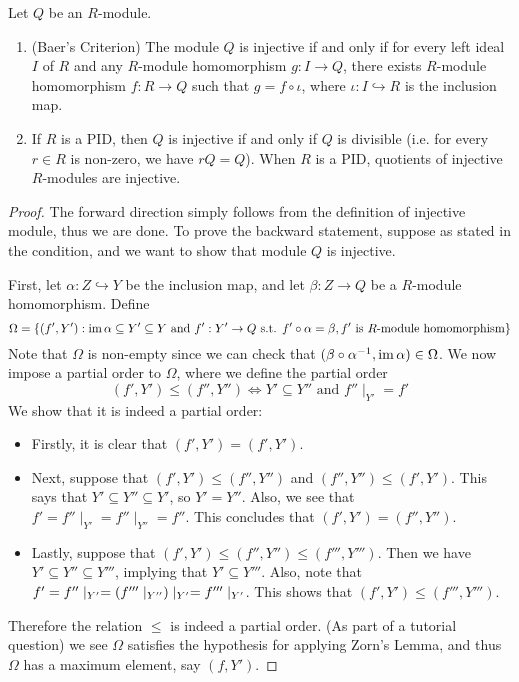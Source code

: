 \begin{pro} \label{pro: Baer}
    Let $Q$ be an $R$-module.
    \begin{enumerate}
        \item (Baer's Criterion) The module $Q$ is injective if and only if for every left ideal $I$ of $R$ and any $R$-module homomorphism $g:I\to Q$, there exists $R$-module homomorphism $f:R\to Q$ such that $g = f\circ \iota$, where $\iota:I\hookrightarrow R$ is the inclusion map.
        \item If $R$ is a PID, then $Q$ is injective if and only if $Q$ is divisible (i.e. for every $r\in R$ is non-zero, we have $rQ=Q$). When $R$ is a PID, quotients of injective $R$-modules are injective.
    \end{enumerate}
\end{pro}
\begin{proof}
    The forward direction simply follows from the definition of injective module, thus we are done. To prove the backward statement, suppose as stated in the condition, and we want to show that module $Q$ is injective.

    First, let $\alpha:Z\hookrightarrow Y$ be the inclusion map, and let $\beta:Z\to Q$ be a $R$-module homomorphism. Define 
    \[\Omega = \left\{(f',Y'):\operatorname{im} \alpha \subseteq Y' \subseteq Y \text{ and } f':Y'\to Q \text{ s.t. } f'\circ \alpha = \beta, f' \text{ is $R$-module homomorphism}\right\}\]
    Note that $\Omega$ is non-empty since we can check that $(\beta\circ \alpha^{-1}, \operatorname{im} \alpha)\in \Omega$. We now impose a partial order to $\Omega$, where we define the partial order
    \[(f',Y')\leq (f'',Y'') \iff Y'\subseteq Y'' \text{ and }f''\mid_{Y'} = f'\]
    We show that it is indeed a partial order:
    \begin{itemize}
        \item Firstly, it is clear that $(f',Y') = (f',Y')$.
        \item Next, suppose that $(f',Y')\leq (f'',Y'')$ and $(f'',Y'')\leq (f',Y')$. This says that $Y'\subseteq Y''\subseteq Y'$, so $Y' = Y''$. Also, we see that $f' = f''\mid _{Y'} = f''\mid _{Y''} = f''$. This concludes that $(f',Y') = (f'',Y'')$.
        \item Lastly, suppose that $(f',Y')\leq (f'',Y'') \leq (f''',Y''')$. Then we have $Y'\subseteq Y''\subseteq Y'''$, implying that $Y'\subseteq Y'''$. Also, note that $f' = f''\mid _{Y'} = \left(f'''\mid _{Y''}\right) \mid_{Y'} = f'''\mid_{Y'}$. This shows that $(f',Y')\le (f''', Y''')$.
    \end{itemize}
    Therefore the relation $\le$ is indeed a partial order. (As part of a tutorial question) we see $\Omega$ satisfies the hypothesis for applying Zorn's Lemma, and thus $\Omega$ has a maximum element, say $(f,Y')$. 
    

\end{proof}
